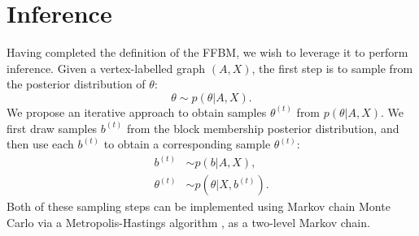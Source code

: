 \section{Inference}
\label{sec:inference}

Having completed the definition of the FFBM, we wish to leverage it 
to perform inference. Given a vertex-labelled graph $(A, X)$,
the first step is to sample from the posterior distribution
of $\theta$:
%
\begin{equation}
	\label{eqn:theta-target}
	\theta \sim p(\theta | A, X).
\end{equation}
%
We propose an iterative approach to obtain samples
$\theta^{(t)}$ from $p(\theta|A,X)$. We first draw samples $b^{(t)}$ 
from the block membership posterior distribution,
and then use each $b^{(t)}$ to obtain a corresponding
sample $\theta^{(t)}$:
%
\begin{align}
	b^{(t)} &\sim p ( b | A, X )  \label{eqn:b-samples},\\
	\theta^{(t)} &\sim p(\theta | X, b^{(t)} ). \label{eqn:theta-samples}
\end{align}
%
Both of these sampling steps can be implemented using
Markov chain Monte Carlo via a Metropolis-Hastings 
algorithm \cite{hastings-alg}, as a two-level Markov chain.

